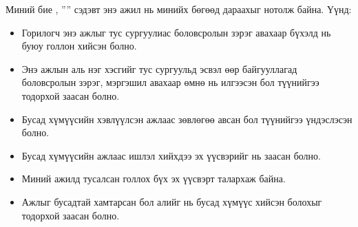 \begin{declaration}
\addchaptertocentry{\authorshipname}

\noindent Миний бие \shortname, ''{\ttitle}'' сэдэвт энэ ажил нь минийх бөгөөд дараахыг нотолж байна. Үүнд:

\begin{itemize}
\item Горилогч энэ ажлыг тус сургуулиас боловсролын зэрэг авахаар бүхэлд нь буюу голлон хийсэн болно.
\item Энэ ажлын аль нэг хэсгийг тус сургуульд эсвэл өөр байгууллагад боловсролын зэрэг, мэргэшил авахаар өмнө нь илгээсэн бол түүнийгээ тодорхой заасан болно.
\item Бусад хүмүүсийн хэвлүүлсэн ажлаас зөвлөгөө авсан бол түүнийгээ үндэслэсэн болно.
\item Бусад хүмүүсийн ажлаас ишлэл хийхдээ эх үүсвэрийг нь заасан болно.
\item Миний ажилд тусалсан голлох бүх эх үүсвэрт талархаж байна.
\item Ажлыг бусадтай хамтарсан бол алийг нь бусад хүмүүс хийсэн болохыг тодорхой заасан болно.
\end{itemize}

\end{declaration}

\clearpage
